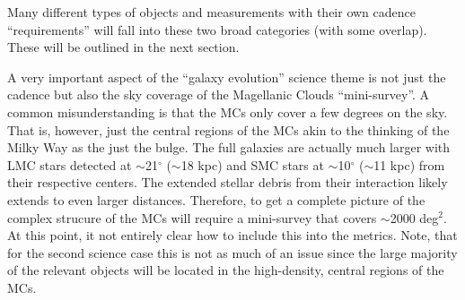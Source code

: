 Many different types of objects and measurements with their own
cadence ``requirements'' will fall into these two broad categories
(with some overlap).  These will be outlined in the next section.

A very important aspect of the ``galaxy evolution'' science theme is
not just the cadence but also the sky coverage of the Magellanic
Clouds ``mini-survey''.  A common misunderstanding is that the MCs
only cover a few degrees on the sky.  That is, however, just the
central regions of the MCs akin to the thinking of the Milky Way as
the just the bulge.  The full galaxies are actually much larger with
LMC stars detected at $\sim$21$^{\circ}$ ($\sim$18 kpc) and SMC stars
at $\sim$10$^{\circ}$ ($\sim$11 kpc) from their respective centers.
The extended stellar debris from their interaction likely extends to
even larger distances.  Therefore, to get a complete picture of the
complex strucure of the MCs will require a mini-survey that covers
$\sim$2000 deg$^2$.  At this point, it not entirely clear how to
include this into the metrics.  Note, that for the second science case
this is not as much of an issue since the large majority of the
relevant objects will be located in the high-density, central regions
of the MCs.






